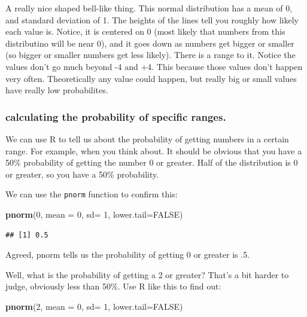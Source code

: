 \documentclass[]{book}
\newenvironment{Shaded}{\begin{snugshade}}{\end{snugshade}}
\newcommand{\KeywordTok}[1]{\textcolor[rgb]{0.13,0.29,0.53}{\textbf{{#1}}}}
\newcommand{\DataTypeTok}[1]{\textcolor[rgb]{0.13,0.29,0.53}{{#1}}}
\newcommand{\DecValTok}[1]{\textcolor[rgb]{0.00,0.00,0.81}{{#1}}}
\newcommand{\OtherTok}[1]{\textcolor[rgb]{0.56,0.35,0.01}{{#1}}}
\newcommand{\NormalTok}[1]{{#1}}
\theoremstyle{definition}
\theoremstyle{definition}
\theoremstyle{definition}
\theoremstyle{remark}
\begin{document}
A really nice shaped bell-like thing. This normal distribution has a
mean of 0, and standard deviation of 1. The heights of the lines tell
you roughly how likely each value is. Notice, it is centered on 0 (most
likely that numbers from this distributino will be near 0), and it goes
down as numbers get bigger or smaller (so bigger or smaller numbers get
less likely). There is a range to it. Notice the values don't go much
beyond -4 and +4. This because those values don't happen very often.
Theoretically any value could happen, but really big or small values
have really low probabilites.

\subsubsection{calculating the probability of specific
ranges.}\label{calculating-the-probability-of-specific-ranges.}

We can use R to tell us about the probability of getting numbers in a
certain range. For example, when you think about. It should be obvious
that you have a 50\% probability of getting the number 0 or greater.
Half of the distribution is 0 or greater, so you have a 50\%
probability.

We can use the \texttt{pnorm} function to confirm this:

\begin{Shaded}
\begin{Highlighting}[]
\KeywordTok{pnorm}\NormalTok{(}\DecValTok{0}\NormalTok{, }\DataTypeTok{mean =} \DecValTok{0}\NormalTok{, }\DataTypeTok{sd=} \DecValTok{1}\NormalTok{, }\DataTypeTok{lower.tail=}\OtherTok{FALSE}\NormalTok{)}
\end{Highlighting}
\end{Shaded}

\begin{verbatim}
## [1] 0.5
\end{verbatim}

Agreed, pnorm tells us the probability of getting 0 or greater is .5.

Well, what is the probability of getting a 2 or greater? That's a bit
harder to judge, obviously less than 50\%. Use R like this to find out:

\begin{Shaded}
\begin{Highlighting}[]
\KeywordTok{pnorm}\NormalTok{(}\DecValTok{2}\NormalTok{, }\DataTypeTok{mean =} \DecValTok{0}\NormalTok{, }\DataTypeTok{sd=} \DecValTok{1}\NormalTok{, }\DataTypeTok{lower.tail=}\OtherTok{FALSE}\NormalTok{)}
\end{Highlighting}
\end{Shaded}
\end{document}
